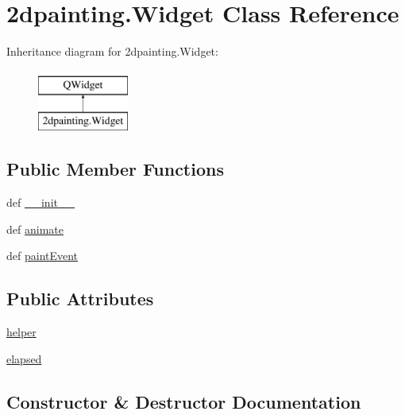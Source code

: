 \hypertarget{class2dpainting_1_1Widget}{}\section{2dpainting.Widget Class Reference}
\label{class2dpainting_1_1Widget}
Inheritance diagram for 2dpainting.Widget\+:\begin{figure}[H]
\begin{center}
\leavevmode
\includegraphics[height=2.000000cm]{class2dpainting_1_1Widget}
\end{center}
\end{figure}
\subsection*{Public Member Functions}
\begin{DoxyCompactItemize}
\item 
def \hyperlink{class2dpainting_1_1Widget_a1ef311afe11d6b891d40cb82681310f4}{\+\_\+\+\_\+init\+\_\+\+\_\+}
\item 
def \hyperlink{class2dpainting_1_1Widget_a7698ae2bfd2375b9a2ecbeaef8151cd3}{animate}
\item 
def \hyperlink{class2dpainting_1_1Widget_a67a895b99e3d85b4606498c86d20970d}{paint\+Event}
\end{DoxyCompactItemize}
\subsection*{Public Attributes}
\begin{DoxyCompactItemize}
\item 
\hyperlink{class2dpainting_1_1Widget_adbc815e383f5979e902b3f41619b8997}{helper}
\item 
\hyperlink{class2dpainting_1_1Widget_a85f3733f17c3512b3ed02036de494132}{elapsed}
\end{DoxyCompactItemize}


\subsection{Constructor \& Destructor Documentation}
\hypertarget{class2dpainting_1_1Widget_a1ef311afe11d6b891d40cb82681310f4}{}
